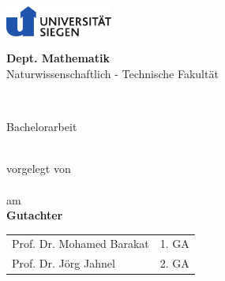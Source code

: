 {\raggedleft\includegraphics[height=1cm]{logo.pdf}\par}
\makeatletter
\begin{center}
  \textbf{Dept. Mathematik}\\
   Naturwissenschaftlich - Technische Fakult\"at\\
   
  \vspace{5cm}
  \begin{Large}
    \textbf{\@title}
  \end{Large}\\
  
  \vspace{2.5cm}
  \begin{large}
    Bachelorarbeit
  \end{large}\\
  vorgelegt von\\
  \@author\\
  am \@date\\
  \vspace{3.5cm}
  \textbf{Gutachter}\\
  \medskip
  \begin{tabular}{lr}
    Prof. Dr. Mohamed Barakat & 1. GA \\
    Prof. Dr. Jörg Jahnel & 2. GA \\
  \end{tabular}
\end{center}
\makeatother
